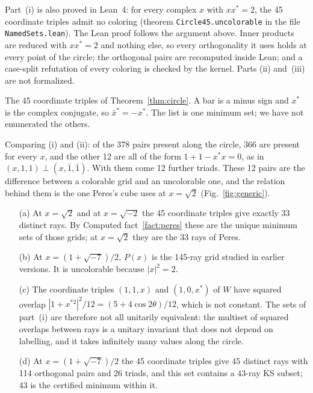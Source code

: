 Part~(i) is also proved in Lean~4: for every complex $x$ with $xx^{*}=2$, the 45 coordinate triples admit
no coloring (theorem \texttt{Circle45.uncolorable} in the file \texttt{NamedSets.lean}).  The Lean proof follows the argument above.  Inner products are reduced with
$xx^{*}=2$ and nothing else, so every orthogonality it uses holds at every point of the circle;
the orthogonal pairs are recomputed inside Lean; and a case-split refutation of every coloring
is checked by the kernel.  Parts (ii) and~(iii) are not formalized.

\begin{table}[t]
\centering
\caption{The 45 coordinate triples of Theorem~\ref{thm:circle}.  A bar is a minus sign and $x^{*}$ is the
complex conjugate, so $\bar x^{*}=-x^{*}$.  The list is one minimum set; we have not enumerated
the others.}
\label{tab:words}
\small

\end{table}

Comparing (i) and (ii): of the 378 pairs present along the circle, 366 are present for every
$x$, and the other 12 are all of the form $1+1-x^{*}x=0$, as in
$(x,1,1)\perp(x,\bar1,\bar1)$.  With them come 12 further triads.  These 12 pairs are the
difference between a colorable grid and an uncolorable one, and the relation behind them is the
one Peres's cube uses at $x=\sqrt2$ (Fig.~\ref{fig:generic}).

\begin{corollary}\label{cor:points}
\begin{enumerate}
\item[(a)] At $x=\sqrt2$ and at $x=\sqrt{-2}$ the 45 coordinate triples give exactly 33 distinct rays.  By
Computed fact~\ref{fact:peres} these are the unique minimum sets of those grids; at $x=\sqrt2$
they are the 33 rays of Peres.
\item[(b)] At $x=(1+\sqrt{-7})/2$, $P(x)$ is the 145-ray grid studied in earlier versions.  It is
uncolorable because $|x|^2=2$.
\item[(c)] The coordinate triples $(1,1,x)$ and $(1,0,x^{*})$ of $W$ have squared overlap
$|1+x^{*2}|^2/12=(5+4\cos2\theta)/12$, which is not constant.  The sets of part~(i) are therefore
not all unitarily equivalent: the multiset of squared overlaps between rays is a unitary
invariant that does not depend on labelling, and it takes infinitely many values along the
circle.
\item[(d)] At $x=(1+\sqrt{-7})/2$ the 45 coordinate triples give 45 distinct rays with 114 orthogonal pairs
and 26 triads, and this set contains a 43-ray KS subset; 43 is the certified minimum within it.
\end{enumerate}
\end{corollary}


